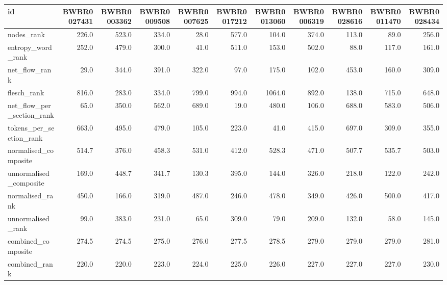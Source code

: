\begin{tabular}{lrrrrrrrrrr}
\toprule
id & BWBR0027431 & BWBR0003362 & BWBR0009508 & BWBR0007625 & BWBR0017212 & BWBR0013060 & BWBR0006319 & BWBR0028616 & BWBR0011470 & BWBR0028434 \\
\midrule
nodes\_rank & 226.0 & 523.0 & 334.0 & 28.0 & 577.0 & 104.0 & 374.0 & 113.0 & 89.0 & 256.0 \\
\cline{1-11}
entropy\_word\_rank & 252.0 & 479.0 & 300.0 & 41.0 & 511.0 & 153.0 & 502.0 & 88.0 & 117.0 & 161.0 \\
\cline{1-11}
net\_flow\_rank & 29.0 & 344.0 & 391.0 & 322.0 & 97.0 & 175.0 & 102.0 & 453.0 & 160.0 & 309.0 \\
\cline{1-11}
flesch\_rank & 816.0 & 283.0 & 334.0 & 799.0 & 994.0 & 1064.0 & 892.0 & 138.0 & 715.0 & 648.0 \\
\cline{1-11}
net\_flow\_per\_section\_rank & 65.0 & 350.0 & 562.0 & 689.0 & 19.0 & 480.0 & 106.0 & 688.0 & 583.0 & 506.0 \\
\cline{1-11}
tokens\_per\_section\_rank & 663.0 & 495.0 & 479.0 & 105.0 & 223.0 & 41.0 & 415.0 & 697.0 & 309.0 & 355.0 \\
\cline{1-11}
normalised\_composite & 514.7 & 376.0 & 458.3 & 531.0 & 412.0 & 528.3 & 471.0 & 507.7 & 535.7 & 503.0 \\
\cline{1-11}
unnormalised\_composite & 169.0 & 448.7 & 341.7 & 130.3 & 395.0 & 144.0 & 326.0 & 218.0 & 122.0 & 242.0 \\
\cline{1-11}
normalised\_rank & 450.0 & 166.0 & 319.0 & 487.0 & 246.0 & 478.0 & 349.0 & 426.0 & 500.0 & 417.0 \\
\cline{1-11}
unnormalised\_rank & 99.0 & 383.0 & 231.0 & 65.0 & 309.0 & 79.0 & 209.0 & 132.0 & 58.0 & 145.0 \\
\cline{1-11}
combined\_composite & 274.5 & 274.5 & 275.0 & 276.0 & 277.5 & 278.5 & 279.0 & 279.0 & 279.0 & 281.0 \\
\cline{1-11}
combined\_rank & 220.0 & 220.0 & 223.0 & 224.0 & 225.0 & 226.0 & 227.0 & 227.0 & 227.0 & 230.0 \\
\cline{1-11}
\bottomrule
\end{tabular}
